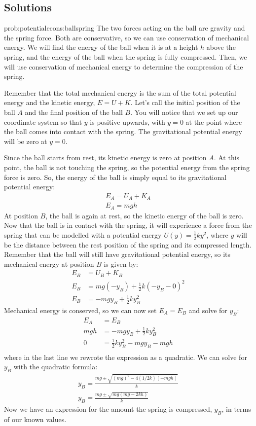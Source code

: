 \newpage
\subsection{Solutions}
\begin{solution}{prob:potentialecons:ballspring}\label{soln:potentialecons:ballspring}
The two forces acting on the ball are gravity and the spring force. Both are conservative, so we can use conservation of mechanical energy. We will find the energy of the ball when it is at a height $h$ above the spring, and the energy of the ball when the spring is fully compressed. Then, we will use conservation of mechanical energy to determine the compression of the spring.

Remember that the total mechanical energy is the sum of the total potential energy and the kinetic energy, $E=U+K$. Let's call the initial position of the ball $A$ and the final position of the ball $B$. You will notice that we set up our coordinate system so that $y$ is positive upwards, with $y=0$ at the point where the ball comes into contact with the spring. The gravitational potential energy will be zero at $y=0$. 

Since the ball starts from rest, its kinetic energy is zero at position $A$. At this point, the ball is not touching the spring, so the potential energy from the spring force is zero. So, the energy of the ball is simply equal to its gravitational potential energy:
\begin{align*}
E_A=U_A+K_A\\
E_A=mgh
\end{align*}
At position $B$, the ball is again at rest, so the kinetic energy of the ball is zero. Now that the ball is in contact with the spring, it will experience a force from the spring that can be modelled with a potential energy $U(y)=\frac{1}{2}ky^2$, where $y$ will be the distance between the rest position of the spring and its compressed length. Remember that the ball will still have gravitational potential energy, so its mechanical energy at position $B$ is given by:
\begin{align*}
E_B&=U_B+K_B\\
E_B&=mg(-y_B)+\frac{1}{2}k(-y_B-0)^2\\
E_B&=-mgy_B+\frac{1}{2}ky_B^2
\end{align*}
Mechanical energy is conserved, so we can now set $E_A=E_B$ and solve for $y_B$:
\begin{align*}
E_A&=E_B\\
mgh&=-mgy_B+\frac{1}{2}ky_B^2\\
0&=\frac{1}{2}ky_B^2-mgy_B-mgh\\
\end{align*}
where in the last line we rewrote the expression as a quadratic. We can solve for $y_B$ with the quadratic formula:
\begin{align*}
y_B=\frac{mg\pm\sqrt{(mg)^2-4(1/2k)(-mgh)}}{k}\\
y_B=\frac{mg\pm\sqrt{mg(mg-2kh)}}{k}
\end{align*}
Now we have an expression for the amount the spring is compressed, $y_B$, in terms of our known values. 
\end{solution}

